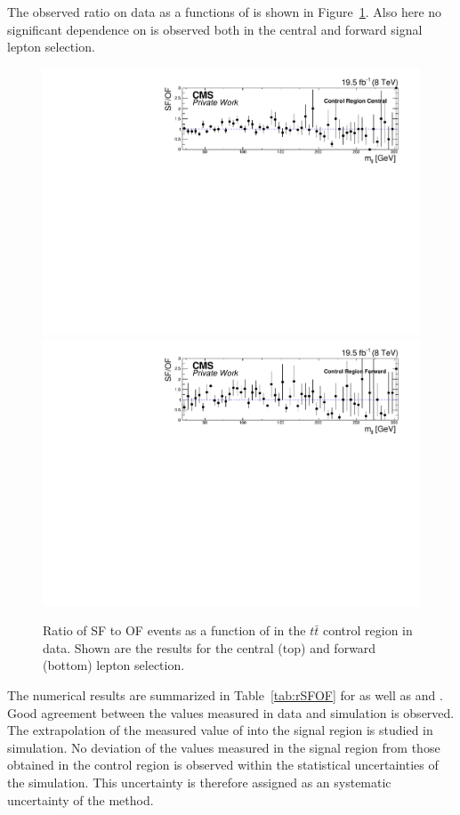 The observed ratio on data as a functions of \mll is shown in Figure~\ref{fig:controlRatio}. Also here no significant dependence on \mll is observed both in the central and forward signal lepton selection.
\begin{figure}
\begin{center}
\includegraphics[scale=0.4]{plots/BG/control/rSFOF_ControlCentral_Full2012_Mll_None.pdf}\\
\includegraphics[scale=0.4]{plots/BG/control/rSFOF_ControlForward_Full2012_Mll_None.pdf}
\caption{Ratio of SF to OF events as a function of \mll in the $t\bar{t}$ control region in data. Shown are the results for the central (top) and forward (bottom) lepton selection.}
\label{fig:controlRatio}
\end{center}
\end{figure}
The numerical results are summarized in Table~\ref{tab:rSFOF} for \Rsfof as well as \Reeof and \Rmmof. Good agreement between the values measured in data and simulation is observed. The extrapolation of the measured value of \Rsfof into the signal region is studied in simulation. No deviation of the values measured in the signal region from those obtained in the control region is observed within the statistical uncertainties of the simulation. This uncertainty is therefore assigned as an systematic uncertainty of the method. 

